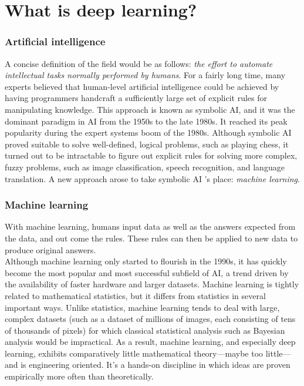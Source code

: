 \documentclass{article}
\numberwithin{equation}{section} %
\begin{document}
\section{What is deep learning?}

\subsubsection{Artificial intelligence}

A concise definition of the field would be as follows: \textit{the effort to automate intellectual tasks normally performed by humans}. For a fairly long time, many experts believed that human-level artificial intelligence could be achieved by having programmers handcraft a sufficiently large set of explicit rules for manipulating knowledge. This approach is known as symbolic AI, and it was the dominant paradigm in AI from the 1950s to the late 1980s. It reached its peak popularity during the expert systems boom of the 1980s. Although symbolic AI proved suitable to solve well-defined, logical problems, such as playing chess, it turned out to be intractable to figure out explicit rules for solving more complex, fuzzy problems, such as image classification, speech recognition, and language translation. A new approach arose to take symbolic AI ’s place: \textit{machine learning}. \\

\subsubsection{Machine learning}

With machine learning, humans input data as well as the answers expected from the data, and out come the rules. These rules can then be applied to new data to produce original answers. \\

Although machine learning only started to flourish in the 1990s, it has quickly
become the most popular and most successful subfield of AI, a trend driven by the
availability of faster hardware and larger datasets. Machine learning is tightly related to mathematical statistics, but it differs from statistics in several important ways. Unlike statistics, machine learning tends to deal with large, complex datasets (such as a dataset of millions of images, each consisting of tens of thousands of pixels) for which classical statistical analysis such as Bayesian analysis would be impractical. As a result, machine learning, and especially deep learning, exhibits comparatively little mathematical theory—maybe too little—and is engineering oriented. It’s a hands-on discipline in which ideas are proven empirically more often than theoretically. \\
\end{document}
